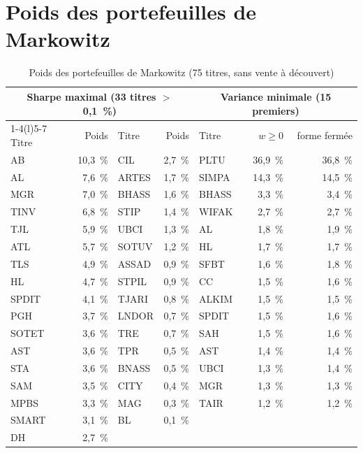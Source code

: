 \documentclass[11pt,a4paper]{article}
\begin{document}
\section{Poids des portefeuilles de Markowitz}\label{ann:poids}
\begin{table}[H]\centering\small\caption{Poids des portefeuilles de Markowitz (75 titres, sans vente à découvert)}\label{tab:annexe-poids}
\begin{tabular}{lr@{\hspace{1.2cm}}lr@{\hspace{1.2cm}}lrr}\toprule
\multicolumn{4}{c}{Sharpe maximal (33 titres $>$ 0,1~\%)} & \multicolumn{3}{c}{Variance minimale (15 premiers)}\\ \cmidrule(r){1-4}\cmidrule(l){5-7}
Titre & Poids & Titre & Poids & Titre & $w \geq 0$ & forme fermée \\ \midrule
AB & 10{,}3~\% & CIL & 2{,}7~\% & PLTU & 36{,}9~\% & 36{,}8~\% \\
AL & 7{,}6~\% & ARTES & 1{,}7~\% & SIMPA & 14{,}3~\% & 14{,}5~\% \\
MGR & 7{,}0~\% & BHASS & 1{,}6~\% & BHASS & 3{,}3~\% & 3{,}4~\% \\
TINV & 6{,}8~\% & STIP & 1{,}4~\% & WIFAK & 2{,}7~\% & 2{,}7~\% \\
TJL & 5{,}9~\% & UBCI & 1{,}3~\% & AL & 1{,}8~\% & 1{,}9~\% \\
ATL & 5{,}7~\% & SOTUV & 1{,}2~\% & HL & 1{,}7~\% & 1{,}7~\% \\
TLS & 4{,}9~\% & ASSAD & 0{,}9~\% & SFBT & 1{,}6~\% & 1{,}8~\% \\
HL & 4{,}7~\% & STPIL & 0{,}9~\% & CC & 1{,}5~\% & 1{,}6~\% \\
SPDIT & 4{,}1~\% & TJARI & 0{,}8~\% & ALKIM & 1{,}5~\% & 1{,}5~\% \\
PGH & 3{,}7~\% & LNDOR & 0{,}7~\% & SPDIT & 1{,}5~\% & 1{,}6~\% \\
SOTET & 3{,}6~\% & TRE & 0{,}7~\% & SAH & 1{,}5~\% & 1{,}6~\% \\
AST & 3{,}6~\% & TPR & 0{,}5~\% & AST & 1{,}4~\% & 1{,}4~\% \\
STA & 3{,}6~\% & BNASS & 0{,}5~\% & UBCI & 1{,}3~\% & 1{,}4~\% \\
SAM & 3{,}5~\% & CITY & 0{,}4~\% & MGR & 1{,}3~\% & 1{,}3~\% \\
MPBS & 3{,}3~\% & MAG & 0{,}3~\% & TAIR & 1{,}2~\% & 1{,}2~\% \\
SMART & 3{,}1~\% & BL & 0{,}1~\% &  & &  \\
DH & 2{,}7~\% &  &  &  & &  \\
\bottomrule\end{tabular}\end{table}
\end{document}
